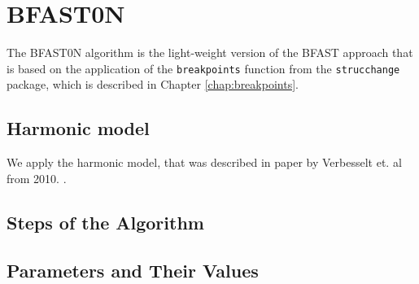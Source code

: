 \documentclass[main.tex]{subfiles}
\begin{document}
\chapter{BFAST0N}
\label{chap:bfast0n}
The BFAST0N algorithm is the light-weight version of the BFAST approach that is based on
the application of the \texttt{breakpoints} function from the
\texttt{strucchange} package, which is described in Chapter
\ref{chap:breakpoints}.

\section{Harmonic model}
\label{sec:harmonic_model}
We apply the harmonic model, that was described in paper
by Verbesselt et. al from 2010. \cite{bfast1}.

\section{Steps of the Algorithm}
\label{sec:bfast0n_algorithm_steps}

\section{Parameters and Their Values}
\label{sec:bfast0n_params}

\biblio
\end{document}
